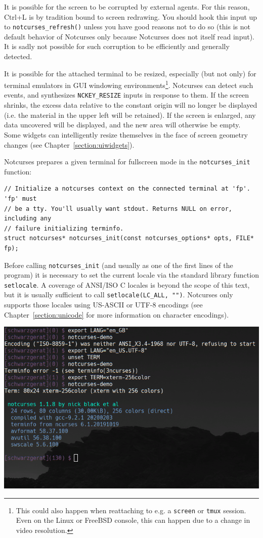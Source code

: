 \documentclass[letterpaper,10pt]{article}
\begin{document}
It is possible for the screen to be corrupted by external agents. For this
reason, Ctrl+L is by tradition bound to screen redrawing. You should hook this
input up to \texttt{notcurses\_refresh()} unless you have good reasons not to
do so (this is not default behavior of Notcurses only because Notcurses does
not itself read input). It is sadly not possible for such corruption to be
efficiently and generally detected.

It is possible for the attached terminal to be resized, especially (but not
only) for terminal emulators in GUI windowing environments\footnote{This could
also happen when reattaching to e.g. a \texttt{screen} or \texttt{tmux} session.
Even on the Linux or FreeBSD console, this can happen due to a change in video
resolution.}. Notcurses can detect such events, and synthesizes
\texttt{NCKEY\_RESIZE} inputs in response to them. If the screen shrinks, the
excess data relative to the constant origin will no longer be displayed (i.e.
the material in the upper left will be retained). If the screen is enlarged,
any data uncovered will be displayed, and the new area will otherwise be empty.
Some widgets can intelligently resize themselves in the face of screen
geometry changes (see Chapter~\ref{section:uiwidgets}).

Notcurses prepares a given terminal for fullscreen mode in the
\texttt{notcurses\_init} function:

\begin{listing}[ht]
\begin{verbatim}
// Initialize a notcurses context on the connected terminal at 'fp'. 'fp' must
// be a tty. You'll usually want stdout. Returns NULL on error, including any
// failure initializing terminfo.
struct notcurses* notcurses_init(const notcurses_options* opts, FILE* fp);
\end{verbatim}
\end{listing}

Before calling \texttt{notcurses\_init} (and usually as one of the first lines
of the program) it is necessary to set the current locale via the standard
library function \texttt{setlocale}. A coverage of ANSI/ISO C locales is beyond
the scope of this text, but it is usually sufficient to call
\texttt{setlocale(LC\_ALL, "")}. Notcurses only supports those locales using
US-ASCII or UTF-8 encodings (see Chapter~\ref{section:unicode} for more
information on character encodings).

    \begin{center}
      \includegraphics[width=.7\linewidth]{media/notcurses-init-fails.png}
    \end{center}
\end{document}
